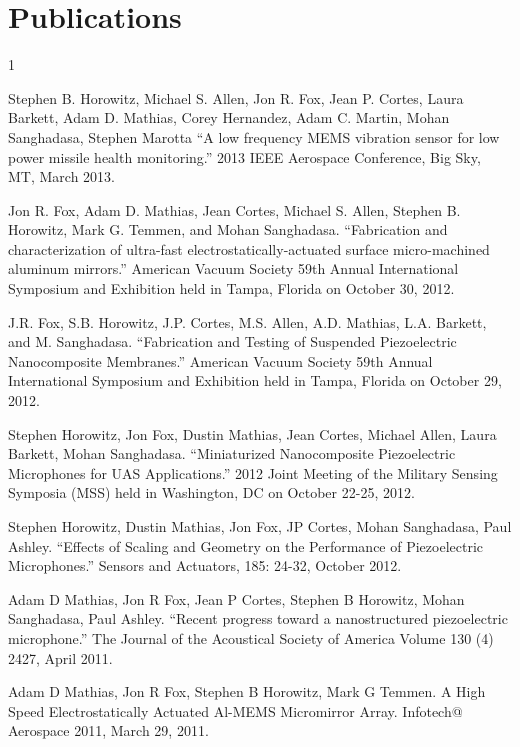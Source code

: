 \documentclass[american]{cv}
\begin{document}
\section{Publications}
\begin{thebibliography}{1}

 Stephen B. Horowitz, Michael S. Allen, Jon R. Fox, Jean
P. Cortes, Laura Barkett, Adam D. Mathias, Corey Hernandez, Adam C. Martin,
Mohan Sanghadasa, Stephen Marotta ``A low frequency MEMS vibration sensor for
low power missile health monitoring.''  2013 IEEE Aerospace Conference, Big
Sky, MT,  March 2013.

 Jon R. Fox, Adam D. Mathias, Jean Cortes, Michael S.
Allen, Stephen B. Horowitz,  Mark G. Temmen, and Mohan Sanghadasa.
``Fabrication and characterization of ultra-fast electrostatically-actuated
surface micro-machined aluminum mirrors.'' American Vacuum Society 59th Annual
International Symposium and Exhibition held in Tampa, Florida on October 30,
2012.

  J.R. Fox, S.B. Horowitz, J.P. Cortes, M.S. Allen,
A.D. Mathias, L.A. Barkett, and M. Sanghadasa. ``Fabrication and Testing of
Suspended Piezoelectric Nanocomposite Membranes.'' American Vacuum Society 59th
Annual International Symposium and Exhibition held in Tampa, Florida on October
29, 2012.

Stephen Horowitz, Jon Fox, Dustin Mathias, Jean Cortes, Michael Allen, Laura Barkett, Mohan Sanghadasa. ``Miniaturized Nanocomposite Piezoelectric Microphones for UAS Applications.'' 2012 Joint Meeting of the Military Sensing Symposia (MSS) held in Washington, DC on October 22-25, 2012.

 Stephen Horowitz, Dustin Mathias, Jon Fox, JP Cortes, Mohan Sanghadasa, Paul Ashley.  ``Effects of Scaling and Geometry on the Performance of Piezoelectric Microphones.'' Sensors and Actuators, 185: 24-32, October 2012.

 Adam D Mathias, Jon R Fox, Jean P Cortes, Stephen B Horowitz, Mohan Sanghadasa, Paul Ashley. ``Recent progress toward a nanostructured piezoelectric microphone.'' The Journal of the Acoustical Society of America Volume 130 (4) 2427, April 2011.

 Adam D Mathias, Jon R Fox, Stephen B Horowitz, Mark G Temmen. A High Speed Electrostatically Actuated Al-MEMS Micromirror Array. Infotech@ Aerospace 2011, March 29, 2011.


\end{thebibliography}
\end{document}
